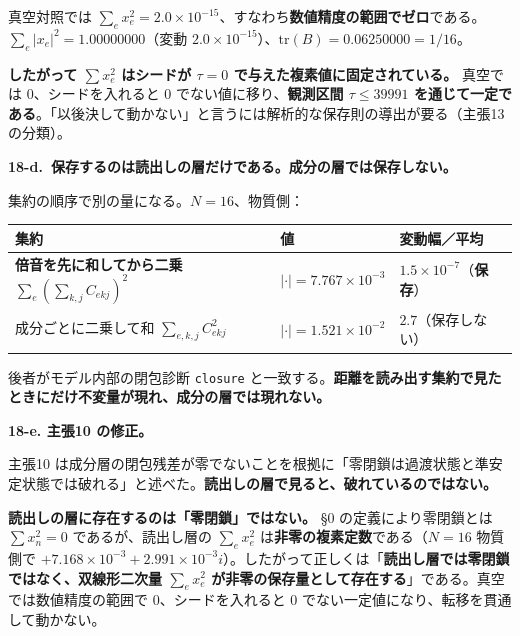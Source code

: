 \documentclass[
  10pt,
]{ltjsarticle}
\newcounter{none} %
\begin{document}
真空対照では
\(\sum_e x_e^2 = 2.0\times10^{-15}\)、すなわち\textbf{数値精度の範囲でゼロ}である。\(\sum_e\lvert x_e\rvert^2 = 1.00000000\)（変動
\(2.0\times10^{-15}\)）、\(\mathrm{tr}(B) = 0.06250000 = 1/16\)。

\textbf{したがって \(\sum x_e^2\) はシードが \(\tau = 0\)
で与えた複素値に固定されている。} 真空では \(0\)、シードを入れると \(0\)
でない値に移り、\textbf{観測区間 \(\tau \le 39991\)
を通じて一定である}。「以後決して動かない」と言うには解析的な保存則の導出が要る（主張13
の分類）。

\textbf{18-d.~保存するのは読出しの層だけである。成分の層では保存しない。}

集約の順序で別の量になる。\(N=16\)、物質側：

{\def\LTcaptype{none} %
\begin{longtable}[]{@{}
  >{\raggedright\arraybackslash}p{}
  >{\raggedright\arraybackslash}p{}
  >{\raggedright\arraybackslash}p{}@{}}
\toprule\noalign{}
\begin{minipage}[b]{\linewidth}\raggedright
集約
\end{minipage} & \begin{minipage}[b]{\linewidth}\raggedright
値
\end{minipage} & \begin{minipage}[b]{\linewidth}\raggedright
変動幅／平均
\end{minipage} \\
\midrule\noalign{}
\endhead
\bottomrule\noalign{}
\endlastfoot
\textbf{倍音を先に和してから二乗}
\(\sum_e\left(\sum_{k,j}C_{ekj}\right)^2\) &
\(\lvert\cdot\rvert = 7.767\times10^{-3}\) &
\(1.5\times10^{-7}\)（\textbf{保存}） \\
成分ごとに二乗して和 \(\sum_{e,k,j}C_{ekj}^2\) &
\(\lvert\cdot\rvert = 1.521\times10^{-2}\) & \(2.7\)（保存しない） \\
\end{longtable}
}

後者がモデル内部の閉包診断 \texttt{closure}
と一致する。\textbf{距離を読み出す集約で見たときにだけ不変量が現れ、成分の層では現れない。}

\textbf{18-e. 主張10 の修正。}

主張10
は成分層の閉包残差が零でないことを根拠に「零閉鎖は過渡状態と準安定状態では破れる」と述べた。\textbf{読出しの層で見ると、破れているのではない。}

\textbf{読出しの層に存在するのは「零閉鎖」ではない。} §0
の定義により零閉鎖とは \(\sum x_n^2 = 0\) であるが、読出し層の
\(\sum_e x_e^2\) は\textbf{非零の複素定数}である（\(N=16\) 物質側で
\(+7.168\times10^{-3}+2.991\times10^{-3}i\)）。したがって正しくは「\textbf{読出し層では零閉鎖ではなく、双線形二次量
\(\sum_e x_e^2\)
が非零の保存量として存在する}」である。真空では数値精度の範囲で
\(0\)、シードを入れると \(0\)
でない一定値になり、転移を貫通して動かない。
\end{document}
